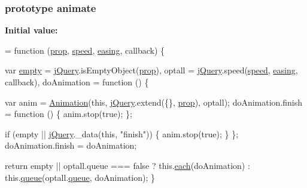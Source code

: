 \subsubsection[{\texorpdfstring{animate}{animate}}]{ {\bf prototype} animate}\hypertarget{jquery-2_82_81-vsdoc_8js_a956a1d08128d41115c45b6815814a64d}{}\label{jquery-2_82_81-vsdoc_8js_a956a1d08128d41115c45b6815814a64d}
{\bfseries Initial value\+:}
\begin{DoxyCode}
= \textcolor{keyword}{function} (\hyperlink{jquery-2_82_81-vsdoc_8js_af17be84954030af6c2286f5da385d41b}{prop}, \hyperlink{jquery-2_82_81-vsdoc_8js_add98c90065e6563cba26ff6d2016c46c}{speed}, \hyperlink{jquery-2_82_81-vsdoc_8js_a9758a312629fa6de1744280dd6e6253b}{easing}, callback) \{
        

        var \hyperlink{jquery-2_82_81-vsdoc_8js_ad242f812bdc5013e0cbf15d6e4d6800a}{empty} = \hyperlink{jquery-2_82_81-vsdoc_8js_add5237586d970a38a81f990e8eb28c6c}{jQuery}.isEmptyObject(\hyperlink{jquery-2_82_81-vsdoc_8js_af17be84954030af6c2286f5da385d41b}{prop}),
            optall = \hyperlink{jquery-2_82_81-vsdoc_8js_add5237586d970a38a81f990e8eb28c6c}{jQuery}.speed(\hyperlink{jquery-2_82_81-vsdoc_8js_add98c90065e6563cba26ff6d2016c46c}{speed}, \hyperlink{jquery-2_82_81-vsdoc_8js_a9758a312629fa6de1744280dd6e6253b}{easing}, callback),
            doAnimation = \textcolor{keyword}{function} () \{
                
                var anim = \hyperlink{jquery-2_82_81-vsdoc_8js_a3299b781c8ec8287357326920ab3565a}{Animation}(\textcolor{keyword}{this}, \hyperlink{jquery-2_82_81-vsdoc_8js_add5237586d970a38a81f990e8eb28c6c}{jQuery}.extend(\{\}, \hyperlink{jquery-2_82_81-vsdoc_8js_af17be84954030af6c2286f5da385d41b}{prop}), optall);
                doAnimation.finish = \textcolor{keyword}{function} () \{
                    anim.stop(\textcolor{keyword}{true});
                \};
                
                \textcolor{keywordflow}{if} (empty || \hyperlink{jquery-2_82_81-vsdoc_8js_add5237586d970a38a81f990e8eb28c6c}{jQuery}.\_data(\textcolor{keyword}{this}, \textcolor{stringliteral}{"finish"})) \{
                    anim.stop(\textcolor{keyword}{true});
                \}
            \};
        doAnimation.finish = doAnimation;

        \textcolor{keywordflow}{return} empty || optall.queue === \textcolor{keyword}{false} ?
            this.\hyperlink{jquery-2_82_81-vsdoc_8js_a77da68323b96573f900f8b5dd3a47954}{each}(doAnimation) :
            this.\hyperlink{jquery-2_82_81-vsdoc_8js_a4a4ce67ab280eb2cff0622a3bdc1f5b3}{queue}(optall.\hyperlink{jquery-2_82_81-vsdoc_8js_a4a4ce67ab280eb2cff0622a3bdc1f5b3}{queue}, doAnimation);
    \}
\end{DoxyCode}
